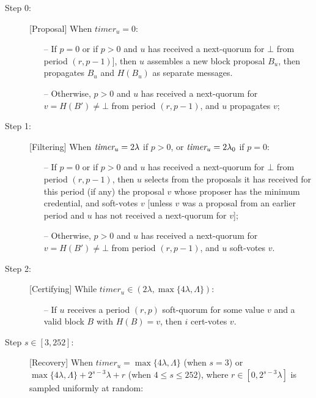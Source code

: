\documentclass[../main.tex]{subfiles}
\begin{document}
\begin{description}

\item[{\sc Step 0:}] [Proposal]
When $timer_u = 0$:
\begin{itemize}

\item[--] If $p = 0$ or if $p>0$ and $u$ has received a next-quorum for $\bot$ from period $(r,p-1)$], then $u$ assembles a new block proposal $B_u$, then propagates $B_u$ and $H(B_u)$ as separate messages.

\item[--] Otherwise, $p>0$ and $u$ has received a next-quorum for $v=H(B') \neq \bot$ from period $(r,p-1)$, and $u$ propagates $v$;

\end{itemize}

\item[{\sc Step 1:}] [Filtering] When $\textit{timer}_u = 2\lambda$ if $p>0$, or $\textit{timer}_u = 2\lambda_0$ if $p=0$:
\begin{itemize}

\item[--] If $p=0$ or if $p>0$ and $u$ has received a next-quorum for $\bot$ from period $(r,p-1)$,
then $u$ selects from the proposals it has received for this period (if any) the proposal $v$ whose proposer has the minimum credential, 
and soft-votes $v$ 
[unless $v$ was a proposal from an earlier period and $u$ has not received a next-quorum for $v$];

\item[--] Otherwise, $p>0$ and $u$ has received a next-quorum for $v=H(B') \neq \bot$ from period $(r,p-1)$, and $u$ soft-votes $v$.
\end{itemize}

\item[{\sc Step 2:}] [Certifying] While $timer_u\in (2\lambda, \max\{4\lambda,\Lambda\})$:

\begin{itemize}
\item[--] If $u$ receives a period $(r,p)$ soft-quorum for some value $v$ and a valid block $B$ with $H(B)=v$, then $i$ cert-votes $v$.
\end{itemize}

\item[{\sc Step $s \in [3,252]$:}] [Recovery]
When $timer_u = \max\{4\lambda,\Lambda\}$ (when $s=3$) or $\max\{4\lambda,\Lambda\} + 2^{s-3} \lambda + r$ (when $4 \leq s \leq 252$), where $r \in [0,2^{s-3}\lambda]$ is sampled uniformly at random:


\end{description}
\end{document}
